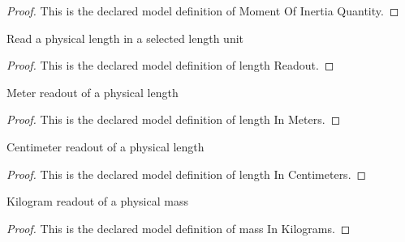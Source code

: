 \begin{proof}
  This is the declared model definition of Moment Of Inertia Quantity.
\end{proof}
\begin{definition}
  \label{def:physics:phyx-mini-0265:phyxminiproblems-problemphyxmini0265-lengthreadout}
  Read a physical length in a selected length unit
\end{definition}
\begin{proof}
  This is the declared model definition of length Readout.
\end{proof}
\begin{definition}
  \label{def:physics:phyx-mini-0265:phyxminiproblems-problemphyxmini0265-lengthinmeters}
  Meter readout of a physical length
\end{definition}
\begin{proof}
  This is the declared model definition of length In Meters.
\end{proof}
\begin{definition}
  \label{def:physics:phyx-mini-0265:phyxminiproblems-problemphyxmini0265-lengthincentimeters}
  Centimeter readout of a physical length
\end{definition}
\begin{proof}
  This is the declared model definition of length In Centimeters.
\end{proof}
\begin{definition}
  \label{def:physics:phyx-mini-0265:phyxminiproblems-problemphyxmini0265-massinkilograms}
  Kilogram readout of a physical mass
\end{definition}
\begin{proof}
  This is the declared model definition of mass In Kilograms.
\end{proof}
